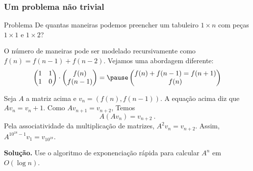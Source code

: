 \begin{frame}
    \frametitle{Um problema não trivial}

    \begin{block}{Problema}
        De quantas maneiras podemos preencher um tabuleiro $1 \times n$ com peças $1 \times 1$ e $1 \times 2$?
    \end{block} \pause

    O número de maneiras pode ser modelado recursivamente como $f(n) = f(n-1) + f(n-2)$. Vejamos uma abordagem diferente: \pause
    \begin{align*}
        \begin{pmatrix}
            1 & 1 \\
            1 & 0
        \end{pmatrix} \cdot 
        \begin{pmatrix}
            f(n) \\
            f(n-1)
        \end{pmatrix} = \pause
        \begin{pmatrix}
            f(n) + f(n-1) = f(n+1) \\
            f(n)
        \end{pmatrix}
    \end{align*} \pause

    Seja $A$ a matriz acima e $v_n = (f(n), f(n-1))$. \pause A equação acima diz que $Av_n = v_n+1$. Como $A v_{n+1} = v_{n+2}$, Temos
        \[ A(Av_n) = v_{n+2} \ . \] \pause
    Pela associatividade da multiplicação de matrizes, $A^2 v_n = v_{n+2}$. Assim, $A^{10^{18} - 1} v_1 = v_{10^{18}}$. \pause

    {\bf Solução.} Use o algoritmo de exponenciação rápida para calcular $A^n$ em $O(\log n)$.
\end{frame}